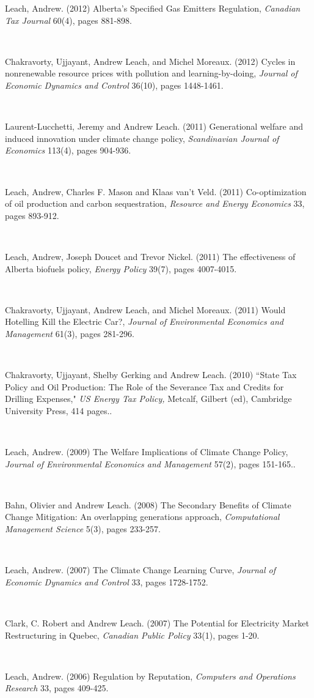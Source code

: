 \documentclass{article}[12pt]
\newcommand{\negind}{\hspace*{-15pt}}
\newcommand{\publication}[6]{\parbox[b]{.93\textwidth}{\negind #1. (#2) #3, \textit{#4} #5, pages #6.}
\hfill \\[-.65ex]}
\newcommand{\book}[6]{\parbox[b]{.93\textwidth}{\negind #1. (#2) ``#3," \textit{#4} #5, #6.}
\hfill \\[-.65ex]}
\begin{document}
\publication{Leach, Andrew}{2012}{Alberta's Specified Gas Emitters
Regulation}{\textit{Canadian Tax Journal}}{60(4)}{881-898}

\publication{Chakravorty, Ujjayant, Andrew Leach, and Michel
Moreaux}{2012}{Cycles in nonrenewable resource prices with pollution and
learning-by-doing}{\textit{Journal of Economic Dynamics and
Control}}{36(10)}{1448-1461}


\publication{Laurent-Lucchetti, Jeremy and Andrew Leach}{2011}{Generational
welfare and induced innovation under climate change
policy}{\textit{Scandinavian Journal of Economics}}{113(4)}{904-936}

\publication{Leach, Andrew, Charles F. Mason and Klaas van't
Veld}{2011}{Co-optimization of oil production and carbon
sequestration}{\textit{Resource and Energy Economics}}{33}{893-912}

\publication{Leach, Andrew, Joseph Doucet and Trevor Nickel}{2011}{The
effectiveness of Alberta biofuels policy}{\textit{Energy Policy}}{39(7)}
{4007-4015}


\publication{Chakravorty, Ujjayant, Andrew Leach, and Michel
Moreaux}{2011}{Would Hotelling Kill the Electric Car?}{\textit{Journal of
Environmental Economics and Management}}{61(3)}{281-296}

\book{Chakravorty, Ujjayant, Shelby Gerking and Andrew Leach}{2010}{State Tax
Policy and Oil Production: The Role of the Severance Tax and Credits for
Drilling Expenses}{US Energy Tax Policy,}{Metcalf, Gilbert (ed), Cambridge
University Press}{414 pages.}


\publication{Leach, Andrew}{2009}{The Welfare Implications of Climate Change
Policy}{Journal of Environmental Economics and Management}{57(2)}{151-165.}

\publication{Bahn, Olivier and Andrew Leach}{2008}{The Secondary Benefits of
Climate Change Mitigation: An overlapping generations approach}{Computational
Management Science}{5(3)}{233-257}

\publication{Leach, Andrew}{2007}{The Climate Change Learning Curve}{Journal of
Economic Dynamics and Control}{33}{1728-1752}

\publication{Clark, C. Robert and Andrew Leach}{2007}{The Potential for
Electricity Market Restructuring in Quebec}{Canadian Public Policy}
{33(1)}{1-20}

\publication{Leach, Andrew}{2006}{Regulation by Reputation}{Computers and
Operations Research}{33}{409-425}
\end{document}

